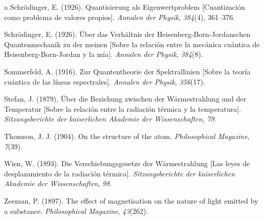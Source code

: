 \documentclass[11pt,a4paper,spanish]{book}
\begin{document}
\begin{thebibliography}{a}
   Schrödinger, E.
  (1926). Quantisierung als Eigenwertproblem [Cuantización como
  problema de valores propios]. \emph{Annalen der Physik},
  \emph{384}(4), 361--376.

  Schrödinger, E. (1926). Über das Verhältnis der
  Heisenberg-Born-Jordanschen Quantenmechanik zu der meinen [Sobre la
    relación entre la mecánica cuántica de Heisenberg-Born-Jordan y la
  mía]. \emph{Annalen der Physik}, \emph{384}(8).

   Sommerfeld, A. (1916).
  Zur Quantentheorie der Spektrallinien [Sobre la teoría cuántica de
  las líneas espectrales]. \emph{Annalen der Physik}, \emph{356}(17).

   Stefan, J. (1879). Über die
  Beziehung zwischen der Wärmestrahlung und der Temperatur [Sobre la
  relación entre la radiación térmica y la temperatura].
  \emph{Sitzungsberichte der kaiserlichen Akademie der
  Wissenschaften}, \emph{79}.

   Thomson, J. J. (1904). On the
  structure of the atom. \emph{Philosophical Magazine}, \emph{7}(39).

   Wien, W. (1893). Die
  Verschiebungsgesetze der Wärmestrahlung [Las leyes de
  desplazamiento de la radiación térmica].
  \emph{Sitzungsberichte der kaiserlichen Akademie der
  Wissenschaften}, \emph{98}.

   Zeeman, P. (1897). The effect of
  magnetisation on the nature of light emitted by a substance.
  \emph{Philosophical Magazine}, \emph{43}(262).

\end{thebibliography}
%
%
\end{document}

